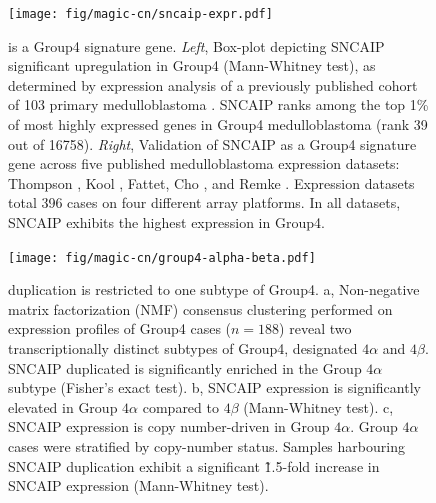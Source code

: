 \begin{figure}[t]
	\begin{center}
		\texttt{[image: fig/magic-cn/sncaip-expr.pdf]}
	\end{center}
	\caption[ is a Group4 signature gene]
	{
	 is a Group4 signature gene.
	\emph{Left}, Box-plot depicting SNCAIP significant upregulation in Group4 (Mann-Whitney test), as determined by expression analysis of a previously published cohort of 103 primary medulloblastoma . SNCAIP ranks among the top 1\% of most highly expressed genes in Group4 medulloblastoma (rank 39 out of 16758).
	\emph{Right}, Validation of SNCAIP as a Group4 signature gene across five published medulloblastoma expression datasets: Thompson , Kool , Fattet, Cho , and Remke . Expression datasets total 396 cases on four different array platforms. In all datasets, SNCAIP exhibits the highest expression in Group4.
	}
	\label{fig:sncaip-expr}
\end{figure}

\begin{figure}[b]
	\begin{center}
		\texttt{[image: fig/magic-cn/group4-alpha-beta.pdf]}
	\end{center}
	\caption[ duplication is restricted to one subtype of Group4]
	{
	 duplication is restricted to one subtype of Group4.
	\textsf{a}, Non-negative matrix factorization (NMF) consensus clustering performed on expression profiles of Group4 cases ($n = 188$) reveal two transcriptionally distinct subtypes of Group4, designated $4\alpha$ and $4\beta$. SNCAIP duplicated is significantly enriched in the Group $4\alpha$ subtype (Fisher's exact test).
	\textsf{b}, SNCAIP expression is significantly elevated in Group $4\alpha$ compared to $4\beta$ (Mann-Whitney test).
	\textsf{c}, SNCAIP expression is copy number-driven in Group $4\alpha$. Group $4\alpha$ cases were stratified by  copy-number status. Samples harbouring SNCAIP duplication exhibit a significant \~1.5-fold increase in SNCAIP expression (Mann-Whitney test).
	}
	\label{fig:group4-alpha-beta}
\end{figure}


